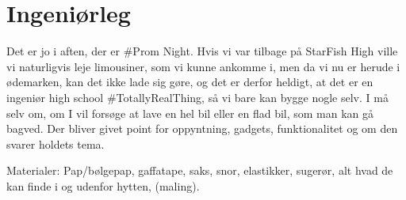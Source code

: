 \section{Ingeniørleg}
Det er jo i aften, der er \#Prom Night. Hvis vi var tilbage på StarFish High ville vi naturligvis leje limousiner, som vi kunne ankomme i, men da vi nu er herude i ødemarken, kan det ikke lade sig gøre, og det er derfor heldigt, at det er en ingeniør high school \#TotallyRealThing, så vi bare kan bygge nogle selv. I må selv om, om I vil forsøge at lave en hel bil eller en flad bil, som man kan gå bagved. Der bliver givet point for oppyntning, gadgets, funktionalitet og om den svarer holdets tema.



Materialer:
Pap/bølgepap, gaffatape, saks, snor, elastikker, sugerør, alt hvad de kan finde i og udenfor hytten, (maling).
